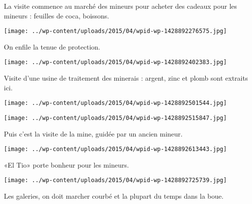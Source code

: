  La visite commence au marché des mineurs pour acheter des cadeaux pour les mineurs : feuilles de coca, boissons.

 

\begin{center} \texttt{[image: ../wp-content/uploads/2015/04/wpid-wp-1428892276575.jpg]} \end{center}



 On enfile la tenue de protection. 

 

\begin{center} \texttt{[image: ../wp-content/uploads/2015/04/wpid-wp-1428892402383.jpg]} \end{center}



 Visite d'une usine de traitement des minerais : argent, zinc et plomb sont extraits ici. 

 

\begin{center} \texttt{[image: ../wp-content/uploads/2015/04/wpid-wp-1428892501544.jpg]} \end{center}



 

\begin{center} \texttt{[image: ../wp-content/uploads/2015/04/wpid-wp-1428892515847.jpg]} \end{center}



 Puis c'est la visite de la mine, guidée par un ancien mineur. 

 

\begin{center} \texttt{[image: ../wp-content/uploads/2015/04/wpid-wp-1428892613443.jpg]} \end{center}



 «El Tio» porte bonheur pour les mineurs. 

 

\begin{center} \texttt{[image: ../wp-content/uploads/2015/04/wpid-wp-1428892725739.jpg]} \end{center}



 Les galeries, on doit marcher courbé et la plupart du temps dans la boue. 

